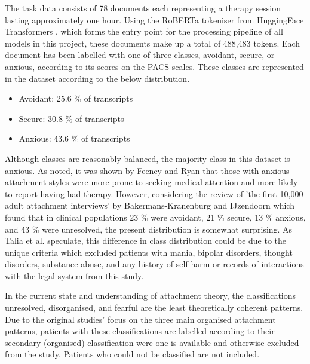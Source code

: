 \documentclass[12pt]{report}
\begin{document}
The task data consists of 78 documents each representing a therapy session lasting approximately one hour.
Using the RoBERTa tokeniser from HuggingFace Transformers \cite{HuggingFace}, which forms the entry point for the processing pipeline of all models in this project, these documents make up a total of 488,483 tokens.
Each document has been labelled with one of three classes, avoidant, secure, or anxious, according to its scores on the PACS scales.
These classes are represented in the dataset according to the below distribution.
\begin{itemize}
    \item {Avoidant: 25.6 \% of transcripts}
    \item {Secure: 30.8 \% of transcripts}
    \item {Anxious: 43.6 \% of transcripts}
\end{itemize}
Although classes are reasonably balanced, the majority class in this dataset is anxious.
As noted, it was shown by Feeney and Ryan \citeyear{Feeney1994} that those with anxious attachment styles were more prone to seeking medical attention and more likely to report having had therapy.
However, considering the review of 'the first 10,000 adult attachment interviews' by Bakermans-Kranenburg and IJzendoorn \citeyear{Bakermanskranenburg2009} which found that in clinical populations 23 \% were avoidant, 21 \% secure, 13 \% anxious, and 43 \% were unresolved, the present distribution is somewhat surprising.
As Talia et al. \citeyear{Talia2017} speculate, this difference in class distribution could be due to the unique criteria which excluded patients with mania, bipolar disorders, thought disorders, substance abuse, and any history of self-harm or records of interactions with the legal system from this study.

In the current state and understanding of attachment theory, the classifications unresolved, disorganised, and fearful are the least theoretically coherent patterns.
Due to the original studies' focus on the three main organised attachment patterns, patients with these classifications are labelled according to their secondary (organised) classification were one is available and otherwise excluded from the study.
Patients who could not be classified are not included.
\end{document}
